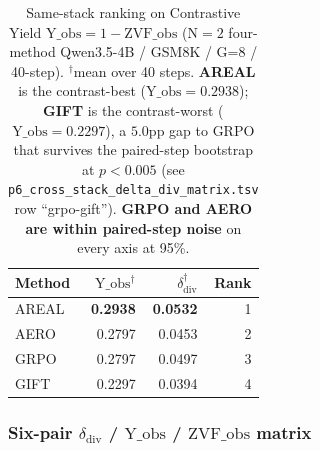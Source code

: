 \begin{table}[h]
\centering
\small
\begin{tabular}{l r r r}
\toprule
\textbf{Method} & $\mathrm{Y\_obs}^{\dagger}$ & $\delta_{\mathrm{div}}^{\dagger}$ & Rank \\
\midrule
AREAL & \textbf{0.2938} & \textbf{0.0532} & 1 \\
AERO  & 0.2797 & 0.0453 & 2 \\
GRPO  & 0.2797 & 0.0497 & 3 \\
GIFT  & 0.2297 & 0.0394 & 4 \\
\bottomrule
\end{tabular}
\caption{Same-stack ranking on Contrastive Yield
$\mathrm{Y\_obs}=1-\mathrm{ZVF\_obs}$
($\mathrm{N\!=\!2}$ four-method Qwen3.5-4B / GSM8K / G=8 / 40-step).
$^{\dagger}$mean over 40 steps.
\textbf{AREAL} is the contrast-best ($\mathrm{Y\_obs}=0.2938$);
\textbf{GIFT} is the contrast-worst ($\mathrm{Y\_obs}=0.2297$),
a $5.0$pp gap to GRPO that survives the paired-step bootstrap at $p<0.005$
(see \texttt{p6\_cross\_stack\_delta\_div\_matrix.tsv} row
``grpo-gift'').
\textbf{GRPO and AERO are within paired-step noise} on every axis at 95\%.}
\label{tab:p6-iter86-rank}
\end{table}

\subsubsection{Six-pair \texorpdfstring{$\delta_{\mathrm{div}}$ / $\mathrm{Y\_obs}$ / $\mathrm{ZVF\_obs}$}{delta_div / Y_obs / ZVF_obs} matrix}

